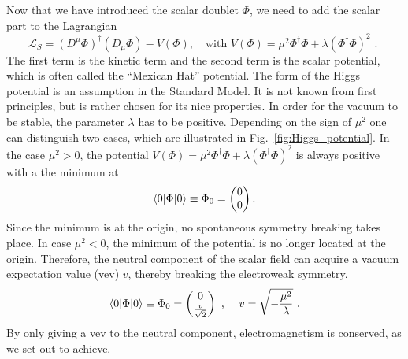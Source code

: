Now that we have introduced the scalar doublet $\Phi$, we need to add the scalar part to the
Lagrangian
\begin{equation}
  \mathcal{L}_{S} = (D^\mu \Phi)^\dagger(D_\mu \Phi) - V(\Phi), \quad \textrm{with } V(\Phi) = \mu^2
\Phi^\dagger \Phi + \lambda (\Phi^\dagger \Phi)^2 \textrm{ . } 
  \label{eq:scalarlagr}
\end{equation}
The first term is the kinetic term and the second term is the scalar potential, which is often
called the ``Mexican Hat'' potential. The form of the Higgs potential is an assumption in the
Standard Model. It is not known from first principles, but is rather chosen for its nice
properties. 
In order for the vacuum to be stable, the parameter $\lambda$ has to be positive. Depending on the
sign of $\mu^2$ one can distinguish two cases, which are illustrated in
Fig.~\ref{fig:Higgs_potential}. 
In the case $\mu^2 > 0$, the potential $V(\Phi) = \mu^2 \Phi^\dagger \Phi + \lambda (\Phi^\dagger
\Phi)^2$ is always positive with a the minimum  at 
\begin{equation}
\braket{0|\Phi|0} \equiv \Phi_0 = \begin{pmatrix}0\\0\end{pmatrix}. 
\end{equation}
Since the minimum is at the origin, no spontaneous symmetry breaking takes place. 
In case $\mu^2 < 0$, the minimum of the potential is no longer located at the origin. Therefore, the
neutral component of the scalar field can acquire a vacuum expectation value (vev) $v$, thereby
breaking the electroweak symmetry.
\begin{equation}
  \braket{0|\Phi|0} \equiv \Phi_0 = \begin{pmatrix} 0 \\ \frac{v}{\sqrt{2}} \end{pmatrix} \textrm{ ,
} \quad v = \sqrt{- \frac{\mu^2}{\lambda}} \textrm{ .}
\end{equation}
By only giving a vev to the neutral component, electromagnetism is conserved, as we set out
to achieve. 

